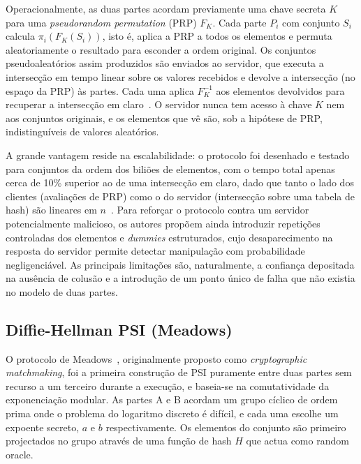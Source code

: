 Operacionalmente, as duas partes acordam previamente uma chave secreta $K$ para uma \emph{pseudorandom permutation} (PRP) $F_K$. Cada parte $P_i$ com conjunto $S_i$ calcula $\pi_i(F_K(S_i))$, isto é, aplica a PRP a todos os elementos e permuta aleatoriamente o resultado para esconder a ordem original. Os conjuntos pseudoaleatórios assim produzidos são enviados ao servidor, que executa a intersecção em tempo linear sobre os valores recebidos e devolve a intersecção (no espaço da PRP) às partes. Cada uma aplica $F_K^{-1}$ aos elementos devolvidos para recuperar a intersecção em claro~\cite{kamara2014scaling}. O servidor nunca tem acesso à chave $K$ nem aos conjuntos originais, e os elementos que vê são, sob a hipótese de PRP, indistinguíveis de valores aleatórios.

A grande vantagem reside na escalabilidade: o protocolo foi desenhado e testado para conjuntos da ordem dos biliões de elementos, com o tempo total apenas cerca de 10\% superior ao de uma intersecção em claro, dado que tanto o lado dos clientes (avaliações de PRP) como o do servidor (intersecção sobre uma tabela de hash) são lineares em $n$~\cite{kamara2014scaling}. Para reforçar o protocolo contra um servidor potencialmente malicioso, os autores propõem ainda introduzir repetições controladas dos elementos e \emph{dummies} estruturados, cujo desaparecimento na resposta do servidor permite detectar manipulação com probabilidade negligenciável. As principais limitações são, naturalmente, a confiança depositada na ausência de colusão e a introdução de um ponto único de falha que não existia no modelo de duas partes.

\subsection{Diffie-Hellman PSI (Meadows)}
\label{sec:dh}

O protocolo de Meadows~\cite{meadows1986matchmaking}, originalmente proposto como \emph{cryptographic matchmaking}, foi a primeira construção de PSI puramente entre duas partes sem recurso a um terceiro durante a execução, e baseia-se na comutatividade da exponenciação modular. As partes A e B acordam um grupo cíclico de ordem prima onde o problema do logaritmo discreto é difícil, e cada uma escolhe um expoente secreto, $a$ e $b$ respectivamente. Os elementos do conjunto são primeiro projectados no grupo através de uma função de hash $H$ que actua como random oracle.

